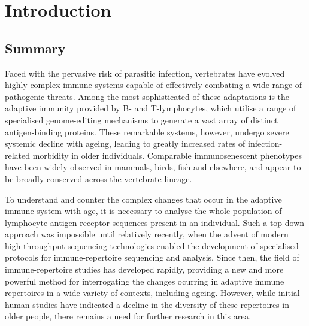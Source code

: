 
\chapter{Introduction}  %
\doublespacing


%

\section*{Summary} %

Faced with the pervasive risk of parasitic infection, vertebrates have evolved highly complex immune systems capable of effectively combating a wide range of pathogenic threats. Among the most sophisticated of these adaptations is the adaptive immunity provided by B- and T-lymphocytes, which utilise a range of specialised genome-editing mechanisms to generate a vast array of distinct antigen-binding proteins. These remarkable systems, however, undergo severe systemic decline with ageing, leading to greatly increased rates of infection-related morbidity in older individuals. Comparable immunosenescent phenotypes have been widely observed in mammals, birds, fish and elsewhere, and appear to be broadly conserved across the vertebrate lineage.

To understand and counter the complex changes that occur in the adaptive immune system with age, it is necessary to analyse the whole population of lymphocyte antigen-receptor sequences present in an individual. Such a top-down approach was impossible until relatively recently, when the advent of modern high-throughput sequencing technologies enabled the development of specialised protocols for immune-repertoire sequencing and analysis. Since then, the field of immune-repertoire studies has developed rapidly, providing a new and more powerful method for interrogating the changes ocurring in adaptive immune repertoires in a wide variety of contexts, including ageing. However, while initial human studies have indicated a decline in the diversity of these repertoires in older people, there remains a need for further research in this area. %

